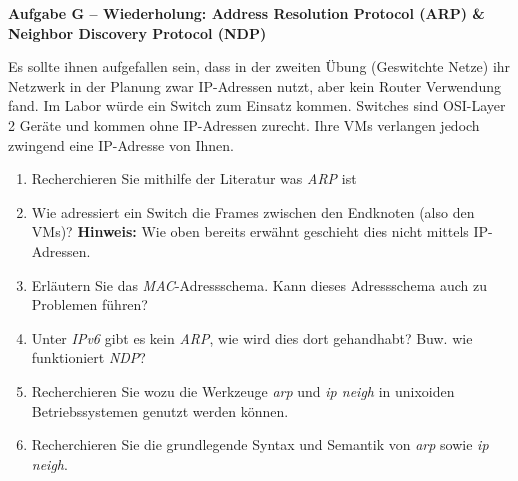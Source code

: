 \documentclass[paper=a4,fontsize=11pt]{scrartcl}%
\numberwithin{equation}{section}
\begin{document}
\begin{center}\Large{\textbf{Aufgabe G -- Wiederholung: Address Resolution Protocol (ARP) \& Neighbor Discovery Protocol (NDP)}}\end{center}\vskip0.25in
Es sollte ihnen aufgefallen sein, dass in der zweiten Übung (Geswitchte Netze) ihr Netzwerk in der Planung zwar IP-Adressen nutzt, aber kein Router Verwendung fand. Im Labor würde ein Switch zum Einsatz kommen. Switches sind OSI-Layer 2 Geräte und kommen ohne IP-Adressen zurecht. Ihre VMs verlangen jedoch zwingend eine IP-Adresse von Ihnen.
\begin{enumerate}
		\item Recherchieren Sie mithilfe der Literatur was \emph{ARP} ist \cite[Kap. 5.4f]{Kurose2012}
		\item Wie adressiert ein Switch die Frames zwischen den Endknoten (also den VMs)? \textbf{Hinweis:} Wie oben bereits erwähnt geschieht dies nicht mittels IP-Adressen.
		\item Erläutern Sie das \emph{MAC}-Adressschema. Kann dieses Adressschema auch zu Problemen führen?
		\item Unter \emph{IPv6} gibt es kein \emph{ARP}, wie wird dies dort gehandhabt? Buw. wie funktioniert \emph{NDP}?
		\item Recherchieren Sie wozu die Werkzeuge \emph{arp} und \emph{ip neigh} in unixoiden Betriebssystemen genutzt werden können.
		\item Recherchieren Sie die grundlegende Syntax und Semantik von \emph{arp} sowie \emph{ip neigh}.
\end{enumerate}
\end{document}
